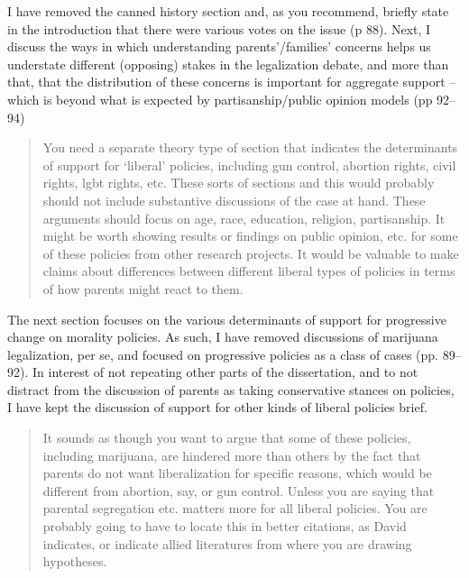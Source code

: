 \documentclass[12pt,stdletter,dateno,sigleft]{newlfm} %
\begin{document}
\begin{newlfm}
I have removed the canned history section and, as you recommend, briefly state in the introduction that there were various votes on the issue (p 88). Next, I discuss the ways in which understanding parents'/families' concerns helps us understate different (opposing) stakes in the legalization debate, and more than that, that the distribution of these concerns is important for aggregate support -- which is beyond what is expected by partisanship/public opinion models (pp 92--94)


\begin{quotation}{\color{red}\noindent \footnotesize
You need a separate theory type of section that indicates the determinants of support for `liberal' policies, including gun control, abortion rights, civil rights, lgbt rights, etc.  These sorts of sections and this would probably should not include substantive discussions of the case at hand. These arguments should focus on age, race, education, religion, partisanship.  It might be worth showing results or findings on public opinion, etc. for some of these policies from other research projects.  It would be valuable to make claims about differences between different liberal types of policies in terms of how parents might react to them. 
}
\end{quotation}



The next section focuses on the various determinants of support for progressive change on morality policies. As such, I have removed discussions of marijuana legalization, per se, and focused on progressive policies as a class of cases (pp. 89--92). In interest of not repeating other parts of the dissertation, and to not distract from the discussion of parents as taking conservative stances on policies, I have kept the discussion of support for other kinds of liberal policies brief. 


\begin{quotation}{\color{red}\noindent \footnotesize
It sounds as though you want to argue that some of these policies, including marijuana, are hindered more than others by the fact that parents do not want liberalization for specific reasons, which would be different from abortion, say, or gun control. Unless you are saying that parental segregation etc. matters more for all liberal policies. You are probably going to have to locate this in better citations, as David indicates, or indicate allied literatures from where you are drawing hypotheses.
}
\end{quotation}


\end{newlfm}
\end{document}
